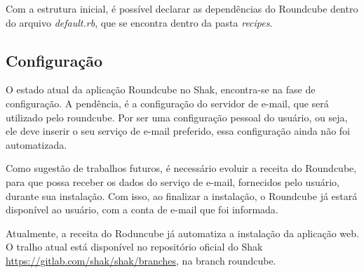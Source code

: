 Com a estrutura inicial, é possível declarar as dependências do Roundcube
dentro do arquivo \textit{default.rb}, que se encontra dentro da pasta 
\textit{recipes}. 

\subsection{Configuração}

O estado atual da aplicação Roundcube no Shak, encontra-se na fase de configuração. A pendência,
é a configuração do servidor de e-mail, que será utilizado pelo roundcube. Por ser
uma configuração pessoal do usuário, ou seja, ele deve inserir o seu serviço
de e-mail preferido, essa configuração ainda não foi automatizada. 

Como sugestão de trabalhos futuros, é necessário evoluir a receita do Roundcube, 
para que possa receber os dados do serviço de e-mail, fornecidos pelo usuário, 
durante sua instalação. Com isso, ao finalizar a instalação, o Roundcube já estará disponível ao usuário, 
com a conta de e-mail que foi informada.

Atualmente, a receita do Roduncube já automatiza a instalação da aplicação web. 
O tralho atual está disponível no repositório oficial do Shak \url{https://gitlab.com/shak/shak/branches}, na branch roundcube.

